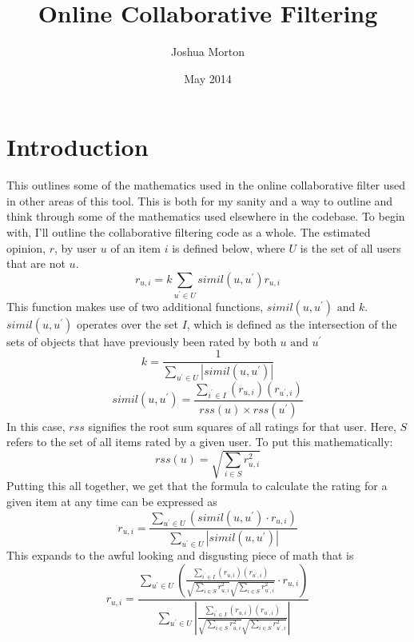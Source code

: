 \documentclass[12pt]{article}
\title{Online Collaborative Filtering}
\author{Joshua Morton}
\date{May 2014}
\begin{document}
  \newcommand{\simil}{simil(u, u^{'})}
  \newcommand{\similarity}{$\simil$ }
  \newcommand{\p}{\newline \indent}
  \newcommand{\Oh}[1]{$\mathcal{O}(#1)$}
  \maketitle
  \tableofcontents

  \pagebreak
  \section{Introduction}
  This outlines some of the mathematics used in the online collaborative filter used in other areas of this tool.  This is both for my sanity and a way to outline and think through some of the mathematics used elsewhere in the codebase.  To begin with, I'll outline the collaborative filtering code as a whole.
  \p The estimated opinion, $ r $, by user $ u $ of an item $ i $ is defined below, where $ U $ is the set of all users that are not $ u $.
  \begin{displaymath}
    r_{u, i} = k \sum_{u^{'} \in U} \simil r_{u, i}
  \end{displaymath}
  \indent This function makes use of two additional functions, $ \simil \text{ and } k $.  \similarity operates over the set $ I $, which is defined as the intersection of the sets of objects that have previously been rated by both $ u \text{ and } u^{'} $
  \begin{displaymath}
    k = \frac{1}{\sum \limits_{u^{'} \in U} |\simil|}
  \end{displaymath}
  \begin{displaymath}
    \simil = \frac{\sum \limits_{i^{'} \in I} (r_{u, i}) (r_{u^{'}, i})}{rss(u) \times rss(u^{'})}
  \end{displaymath}
  \indent In this case, $rss$ signifies the root sum squares of all ratings for that user.  Here, $S$ refers to the set of all items rated by a given user.  To put this mathematically:
  \begin{displaymath}
    rss(u) = \sqrt{\sum \limits_{i \in S} r_{u, i}^2}
  \end{displaymath}
  \indent Putting this all together, we get that the formula to calculate the rating for a given item at any time can be expressed as
  \begin{displaymath}
    r_{u, i} = \frac{\sum \limits_{u^{'} \in U} (\simil \cdot r_{u, i})}{\sum \limits_{u^{'} \in U} |\simil|}
  \end{displaymath}
  \indent  This expands to the awful looking and disgusting piece of math that is
  \begin{displaymath}
    r_{u, i} = \frac{
    \sum \limits_{u^{'} \in U} (\frac{\sum \limits_{i^{'} \in I} (r_{u, i}) (r_{u^{'}, i})}{\sqrt{\sum \limits_{i \in S} r_{u, i}^2} \sqrt{\sum \limits_{i \in S} r_{u^{'}, i}^2}} \cdot r_{u, i})}{\sum \limits_{u^{'} \in U} |\frac{\sum \limits_{i^{'} \in I} (r_{u, i}) (r_{u^{'}, i})}{\sqrt{\sum \limits_{i \in S} r_{u, i}^2} \sqrt{\sum \limits_{i \in S} r_{u^{'}, i}^2}}|}
  \end{displaymath}
\end{document}
